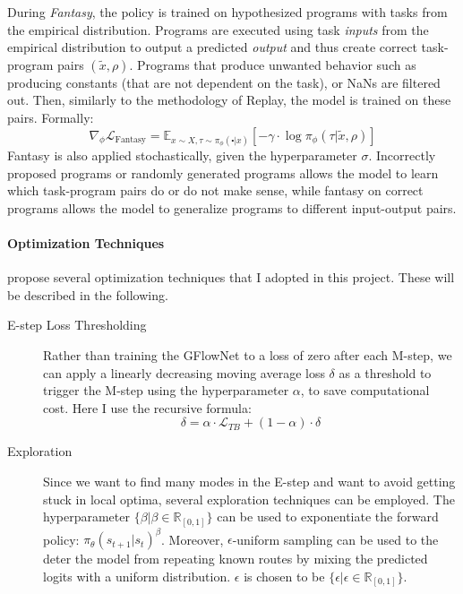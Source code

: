 During \emph{Fantasy}, the policy is trained on hypothesized programs with tasks from the empirical distribution. Programs are executed using task \emph{inputs} from the empirical distribution to output a predicted \emph{output} and thus create correct task-program pairs $(\tilde{x}, \rho)$. Programs that produce unwanted behavior such as producing constants (that are not dependent on the task), or NaNs are filtered out. Then, similarly to the methodology of Replay, the model is trained on these pairs. Formally:
    \begin{equation}
        \nabla_\phi\mathcal{L}_{\text{Fantasy}} = \mathbb{E}_{x \sim X, \tau \sim \pi_\phi(\centerdot|x)} \left[ - \gamma \cdot \log \pi_\phi(\tau \vert \tilde{x}, \rho) \right]
    \end{equation}
Fantasy is also applied stochastically, given the hyperparameter $\sigma$. 
Incorrectly proposed programs or randomly generated programs allows the model to learn which task-program pairs do or do not make sense, while fantasy on correct programs allows the model to generalize programs to different input-output pairs.

\paragraph*{Optimization Techniques} \citet{Hu_Malkin_Jain_Everett_Graikos_Bengio_2023} propose several optimization techniques that I adopted in this project. These will be described in the following.
\begin{description}
    \item[E-step Loss Thresholding] Rather than training the GFlowNet to a loss of zero after each M-step, we can apply a linearly decreasing moving average loss $\delta$ as a threshold to trigger the M-step using the hyperparameter $\alpha$, to save computational cost. Here I use the recursive formula:
    \begin{equation}\label{eq:threshold}
        \delta = \alpha \cdot \mathcal{L}_{TB} + (1 - \alpha) \cdot \delta
    \end{equation}
    \item[Exploration] Since we want to find many modes in the E-step and want to avoid getting stuck in local optima, several exploration techniques can be employed.
    The hyperparameter $\{\beta \vert \beta \in \mathbb{R}_{[0, 1]} \}$ can be used to exponentiate the forward policy: $ \pi_\theta(s_{t+1}|s_t)^\beta $.
    Moreover, $\epsilon$-uniform sampling can be used to the deter the model from repeating known routes by mixing the predicted logits with a uniform distribution. $\epsilon$ is chosen to be $\{\epsilon \vert \epsilon \in \mathbb{R}_{[0, 1]} \}$.
\end{description}

